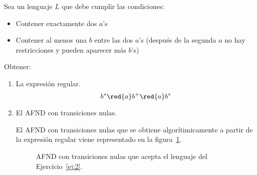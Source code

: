 \documentclass[12pt]{article}
\begin{document}
\begin{ejercicio} \label{ej:2}
    Sea un lenguaje $L$ que debe cumplir las condiciones:
    \begin{itemize}
        \item Contener exactamente dos $a$'s
        \item Contener al menos una $b$ entre las dos $a$'s (después de la segunda $a$ no hay restricciones y pueden aparecer más $b$'s)
    \end{itemize}
    Obtener:
    \begin{enumerate}
        \item La expresión regular.
        \begin{equation*}
            b^*\red{a}b^+\red{a}b^*
        \end{equation*}

        \item El AFND con transiciones nulas.
        
        El AFND con transiciones nulas que se obtiene algorítimicamente a partir de la expresión regular viene representado en la figura~\ref{fig:2-AFND}.
        \begin{figure}[h]
            \centering
            \caption{AFND con transiciones nulas que acepta el lenguaje del Ejercicio~\ref{ej:2}.}
            \label{fig:2-AFND}
        \end{figure}


\end{enumerate}
\end{ejercicio}
\end{document}
